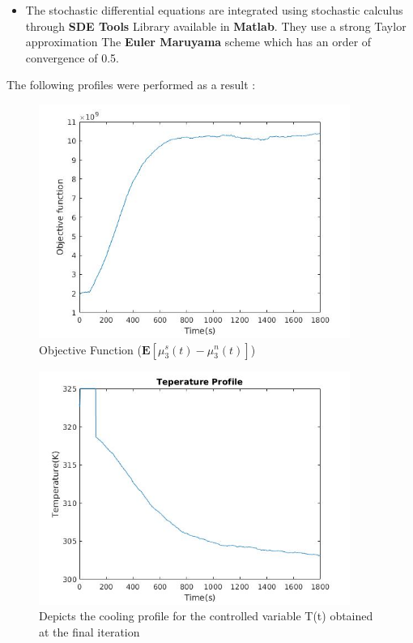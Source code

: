 \begin{itemize}
\item The stochastic differential equations are integrated using stochastic calculus through \textbf{SDE Tools} Library available in \textbf{Matlab}. They use a strong Taylor approximation The \textbf{Euler Maruyama} scheme which has an order of convergence of 0.5. 
\end{itemize}
The following profiles were performed as a result :
\begin{figure}[h!] 
\caption{Objective Function ($\mathbf{E}\left[\mu_{3}^{s}(t) - \mu_{3}^{n}(t)\right]$)}
\begin{center}
\includegraphics[width=4in]{Obj_Stochastic.jpg}
\end{center}
\end{figure}
\begin{figure}[h!] 
\caption{Depicts the cooling profile for the controlled variable T(t) obtained at the final iteration}
\begin{center}
\includegraphics[width=4in]{Temp_Stochastic.jpg}
\end{center}
\end{figure}
\clearpage

